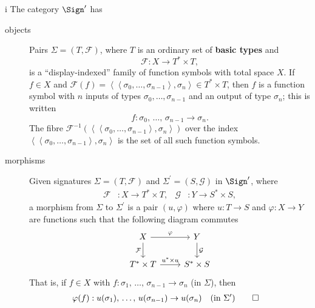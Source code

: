 \begin{partsolution}{i}
The category \(\Sign^\prime\) has
\begin{description}
\item[objects]
Pairs \(\Sigma = (T, \mathcal{F})\), where \(T\) is an ordinary set of \textbf{basic types} and
\begin{equation*}
\mathcal{F} : X \to T^* \times T,
\end{equation*}
is a ``display-indexed'' family of function symbols with total space \(X\).
If \(f \in X\) and \(\mathcal{F}(f) = \left\langle\left\langle\sigma_0,\ldots,\sigma_{n-1}\right\rangle,\sigma_n\right\rangle \in T^* \times T\), then \(f\) is a function symbol with \(n\) inputs of types \(\sigma_0, \ldots, \sigma_{n-1}\) and an output of type \(\sigma_n\); this is written
\begin{equation*}
f : \sigma_0,\,\ldots,\,\sigma_{n-1} \to \sigma_n.
\end{equation*}
The fibre \(\mathcal{F}^{-1}\left(\left\langle\left\langle\sigma_0,\ldots,\sigma_{n-1}\right\rangle,\sigma_n\right\rangle\right)\) over the index \(\left\langle\left\langle\sigma_0,\ldots,\sigma_{n-1}\right\rangle,\sigma_n\right\rangle\) is the set of all such function symbols.
\item[morphisms]
Given signatures \(\Sigma = (T, \mathcal{F})\) and \(\Sigma^\prime = (S, \mathcal{G})\) in \(\Sign^\prime\), where 
\begin{align*}
\mathcal{F} &: X \to T^* \times T, &
\mathcal{G} &: Y \to S^* \times S,
\end{align*}
a morphism from \(\Sigma\) to \(\Sigma^\prime\) is a pair \((u, \varphi)\) where \(u : T \to S\) and \(\varphi : X \to Y\) are functions such that the following diagram commutes
\begin{equation*}
\begin{tikzcd}
X \arrow[r, "\varphi"] \arrow[d, "\mathcal{F}"{left}]
& Y \arrow[d, "\mathcal{G}"{right}] \\
T^* \times T \arrow[r, "u^* \times u"]
& S^* \times S
\end{tikzcd}
\end{equation*}
That is, if \(f \in X\) with \(f : \sigma_1,\,\ldots,\,\sigma_{n-1}\to\sigma_n\) (in \(\Sigma\)), then
\begin{align*}
\varphi(f) &: u(\sigma_1),\, \ldots,\, u(\sigma_{n-1}) \to u(\sigma_n)
&&\text{(in \(\Sigma^\prime\))}
\qedhere
\end{align*}
\end{description}
\end{partsolution}